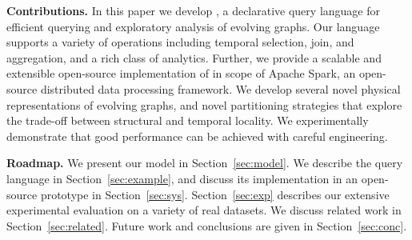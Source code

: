{\bf Contributions.} In this paper we develop \ql, a declarative query
language for efficient querying and exploratory analysis of evolving
graphs. Our language supports a variety of operations including
temporal selection, join, and aggregation, and a rich class of
analytics.  Further, we provide a scalable and extensible open-source
implementation of \ql in scope of Apache Spark, an open-source
distributed data processing framework.  We develop several novel
physical representations of evolving graphs, and novel partitioning
strategies that explore the trade-off between structural and temporal
locality.  We experimentally demonstrate that good performance can be
achieved with careful engineering.

{\bf Roadmap.}  We present our model in Section~\ref{sec:model}.  We
describe the \ql query language in Section~\ref{sec:example}, and
discuss its implementation in an open-source prototype in
Section~\ref{sec:sys}.  Section~\ref{sec:exp} describes our extensive
experimental evaluation on a variety of real datasets.  We discuss
related work in Section~\ref{sec:related}.  Future work and
conclusions are given in Section~\ref{sec:conc}.
